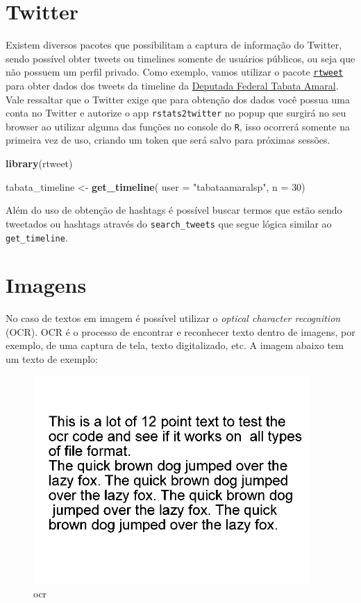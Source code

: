 \documentclass[]{book}
\newenvironment{Shaded}{\begin{snugshade}}{\end{snugshade}}
\newcommand{\DataTypeTok}[1]{\textcolor[rgb]{0.13,0.29,0.53}{#1}}
\newcommand{\DecValTok}[1]{\textcolor[rgb]{0.00,0.00,0.81}{#1}}
\newcommand{\KeywordTok}[1]{\textcolor[rgb]{0.13,0.29,0.53}{\textbf{#1}}}
\newcommand{\NormalTok}[1]{#1}
\newcommand{\StringTok}[1]{\textcolor[rgb]{0.31,0.60,0.02}{#1}}
\begin{document}
\hypertarget{twitter}{%
\section{Twitter}\label{twitter}}

Existem diversos pacotes que possibilitam a captura de informação do Twitter, sendo
possível obter tweets ou timelines somente de usuários públicos, ou seja que não possuem
um perfil privado. Como exemplo, vamos utilizar o pacote \href{https://github.com/ropensci/rtweet}{\texttt{rtweet}}
para obter dados dos tweets da timeline da \href{https://www.camara.leg.br/deputados/204534}{Deputada Federal Tabata Amaral}.
Vale ressaltar que o Twitter exige que para obtenção dos dados você possua uma conta
no Twitter e autorize o app \texttt{rstats2twitter} no popup que surgirá no seu browser
ao utilizar alguma das funções no console do \texttt{R}, isso ocorrerá somente na primeira
vez de uso, criando um token que será salvo para próximas sessões.

\begin{Shaded}
\begin{Highlighting}[]
\KeywordTok{library}\NormalTok{(rtweet)}

\NormalTok{tabata_timeline <-}\StringTok{ }\KeywordTok{get_timeline}\NormalTok{( }\DataTypeTok{user =} \StringTok{"tabataamaralsp"}\NormalTok{, }\DataTypeTok{n =} \DecValTok{30}\NormalTok{)}
\end{Highlighting}
\end{Shaded}

Além do uso de obtenção de hashtags é possível buscar termos que estão sendo tweetados
ou hashtags através do \texttt{search\_tweets} que segue lógica similar ao \texttt{get\_timeline}.

\hypertarget{imagens}{%
\section{Imagens}\label{imagens}}

No caso de textos em imagem é possível utilizar o \emph{optical character recognition} (OCR). OCR
é o processo de encontrar e reconhecer texto dentro de imagens, por exemplo, de uma captura
de tela, texto digitalizado, etc. A imagem abaixo tem um texto de exemplo:

\begin{figure}
\centering
\includegraphics[width=4.16667in,height=\textheight]{images/testocr.png}
\caption{ocr}
\end{figure}
\end{document}
